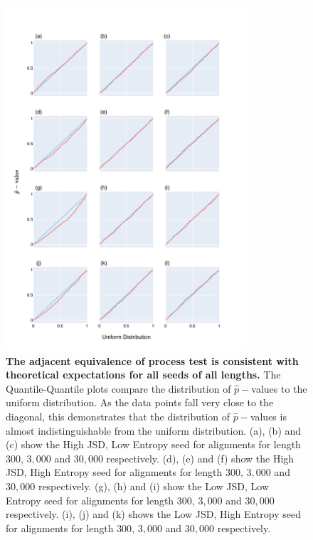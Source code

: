 \begin{figure}[!ht]
\centering
\includegraphics[width=0.8\textwidth]{figures/plots/synthetic/adj_eop/all_seeds.pdf}
\caption[The adjacent equivalence of process test is consistent with theoretical expectations for all seeds of all lengths]{\textbf{The adjacent equivalence of process test is consistent with theoretical expectations for all seeds of all lengths.} The Quantile-Quantile plots compare the distribution of $\hat p-$values to the uniform distribution. As the data points fall very close to the diagonal, this demonstrates that the distribution of $\hat p-$values is almost indistinguishable from the uniform distribution. (a), (b) and (c) show the High JSD, Low Entropy seed for alignments for length $300$, $3,000$ and $30,000$ respectively. (d), (e) and (f) show the High JSD, High Entropy seed for alignments for length $300$, $3,000$ and $30,000$ respectively. (g), (h) and (i) show the Low JSD, Low Entropy seed for alignments for length $300$, $3,000$ and $30,000$ respectively. (i), (j) and (k) shows the Low JSD, High Entropy seed for alignments for length $300$, $3,000$ and $30,000$ respectively.}
\label{fig:synthetic/adj_eop/all_seeds}
\end{figure}
